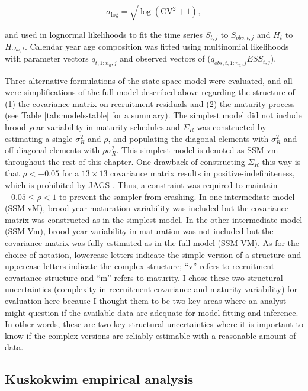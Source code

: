 \documentclass[12pt,]{book}
\theoremstyle{definition}
\theoremstyle{definition}
\theoremstyle{definition}
\theoremstyle{remark}
\begin{document}
\begin{equation}
  \sigma_{\text{log}}=\sqrt{\log(\text{CV}^2+1)},
  \label{eq:cv2sig}
\end{equation}

\noindent
and used in lognormal likelihoods to fit the time series \(S_{t,j}\) to
\(S_{obs,t,j}\) and \(H_t\) to \(H_{obs,t}\). Calendar year age
composition was fitted using multinomial likelihoods with parameter
vectors \(q_{t,1:n_a,j}\) and observed vectors of
(\(q_{obs,t,1:n_a,j} ESS_{t,j}\)).

Three alternative formulations of the state-space model were evaluated,
and all were simplifications of the full model described above regarding
the structure of (1) the covariance matrix on recruitment residuals and
(2) the maturity process (see Table \ref{tab:models-table} for a
summary). The simplest model did not include brood year variability in
maturity schedules and \(\Sigma_R\) was constructed by estimating a
single \(\sigma_R^2\) and \(\rho\), and populating the diagonal elements
with \(\sigma_R^2\) and off-diagonal elements with \(\rho \sigma_R^2\).
This simplest model is denoted as SSM-vm throughout the rest of this
chapter. One drawback of constructing \(\Sigma_R\) this way is that
\(\rho < -0.05\) for a \(13 \times 13\) covariance matrix results in
positive-indefiniteness, which is prohibited by JAGS
\citep{plummer-2017}. Thus, a constraint was required to maintain
\(-0.05 \le \rho < 1\) to prevent the sampler from crashing. In one
intermediate model (SSM-vM), brood year maturation variability was
included but the covariance matrix was constructed as in the simplest
model. In the other intermediate model (SSM-Vm), brood year variability
in maturation was not included but the covariance matrix was fully
estimated as in the full model (SSM-VM). As for the choice of notation,
lowercase letters indicate the simple version of a structure and
uppercase letters indicate the complex structure; ``v'' refers to
recruitment covariance structure and ``m'' refers to maturity. I chose
these two structural uncertainties (complexity in recruitment covariance
and maturity variability) for evaluation here because I thought them to
be two key areas where an analyst might question if the available data
are adequate for model fitting and inference. In other words, these are
two key structural uncertainties where it is important to know if the
complex versions are reliably estimable with a reasonable amount of
data.

\subsection{Kuskokwim empirical
analysis}\label{kuskokwim-empirical-analysis}
\end{document}
